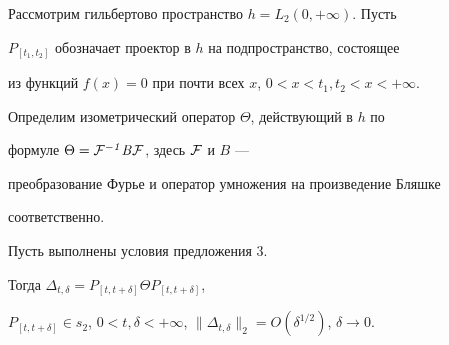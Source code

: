 Рассмотрим гильбертово пространство $h=L_2(0,+\infty)$. Пусть


$P_{[t_1,t_2]}$ обозначает проектор в $h$ на подпространство, состоящее


из функций $f(x)=0$ при почти всех $x$, $0<x<t_1,t_2<x<+\infty$.


Определим изометрический оператор $\Theta$, действующий в $h$ по


формуле $\Theta =\cal F\it ^{-1}B\cal F$, здесь $\cal F$ и $B$ ---


преобразование Фурье и оператор умножения на произведение Бляшке


соответственно.





\begin{prop}


Пусть выполнены условия предложения $3$.


Тогда $\Delta_{t,\delta}=P_{[t,t+\delta ]}\Theta P_{[t,t+\delta ]}$,


$P_{[t,t+\delta ]}\in s_2$, $0<t,\delta <+\infty$, $\|\Delta_{t,\delta}\|_2=


O({\delta}^{1/2})$, $\delta \to 0$.


\end{prop}





